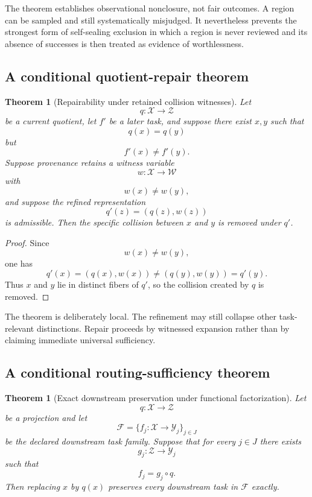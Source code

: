 \documentclass[11pt]{article}
\newtheorem{theorem}[definition]{Theorem}
\theoremstyle{definition}
\begin{document}
The theorem establishes observational nonclosure, not fair outcomes. A region can be sampled and still systematically misjudged. It nevertheless prevents the strongest form of self-sealing exclusion in which a region is never reviewed and its absence of successes is then treated as evidence of worthlessness.

\subsection{A conditional quotient-repair theorem}

\begin{theorem}[Repairability under retained collision witnesses]
Let
\[
q:\mathcal{X}\to\mathcal{Z}
\]
be a current quotient, let \(f'\) be a later task, and suppose there exist \(x,y\) such that
\[
q(x)=q(y)
\]
but
\[
f'(x)\neq f'(y).
\]
Suppose provenance retains a witness variable
\[
w:\mathcal{X}\to\mathcal{W}
\]
with
\[
w(x)\neq w(y),
\]
and suppose the refined representation
\[
q'(z)
=
(q(z),w(z))
\]
is admissible. Then the specific collision between \(x\) and \(y\) is removed under \(q'\).
\end{theorem}

\begin{proof}
Since
\[
w(x)\neq w(y),
\]
one has
\[
q'(x)
=
(q(x),w(x))
\neq
(q(y),w(y))
=
q'(y).
\]
Thus \(x\) and \(y\) lie in distinct fibers of \(q'\), so the collision created by \(q\) is removed.
\end{proof}

The theorem is deliberately local. The refinement may still collapse other task-relevant distinctions. Repair proceeds by witnessed expansion rather than by claiming immediate universal sufficiency.

\subsection{A conditional routing-sufficiency theorem}

\begin{theorem}[Exact downstream preservation under functional factorization]
Let
\[
q:\mathcal{X}\to\mathcal{Z}
\]
be a projection and let
\[
\mathcal{F}
=
\{f_j:\mathcal{X}\to\mathcal{Y}_j\}_{j\in J}
\]
be the declared downstream task family. Suppose that for every \(j\in J\) there exists
\[
g_j:\mathcal{Z}\to\mathcal{Y}_j
\]
such that
\[
f_j=g_j\circ q.
\]
Then replacing \(x\) by \(q(x)\) preserves every downstream task in \(\mathcal{F}\) exactly.
\end{theorem}
\end{document}
